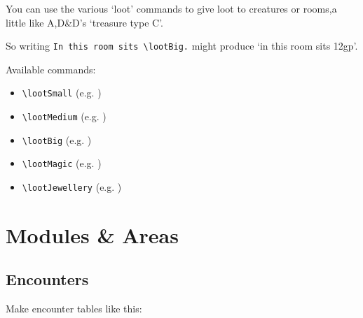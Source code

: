 \documentclass[a4paper,openany]{book}
\begin{document}
\begin{multicols}{2}
You can use the various `loot' commands to give loot to creatures or rooms,a little like A,D\&D's `treasure type C'.

So writing \verb"In this room sits \lootBig." might produce `in this room sits 12gp'.

Available commands:

\begin{itemize}

  \item
  \verb"\lootSmall" (e.g. \lootSmall)
  \item
  \verb"\lootMedium" (e.g. \lootMedium)
  \item
  \verb"\lootBig" (e.g. \lootBig)
  \item
  \verb"\lootMagic" (e.g. \lootMagic)
  \item
  \verb"\lootJewellery" (e.g. \lootJewellery)

\end{itemize}

\end{multicols}

\section{Modules \& Areas}

\subsection{Encounters}

Make encounter tables like this:
\end{document}
